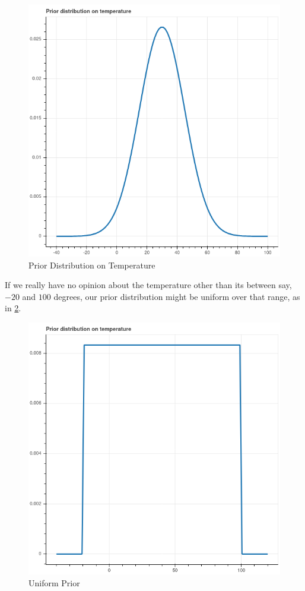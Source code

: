 \documentclass[
]{article}
\begin{document}
\begin{figure}
\hypertarget{fig:tempprior}{%
\centering
\includegraphics{../img/prior.png}
\caption{Prior Distribution on Temperature}\label{fig:tempprior}
}
\end{figure}

If we really have no opinion about the temperature other than its
between say, \(-20\) and \(100\) degrees, our prior distribution might
be uniform over that range, as in \cref{fig:uniformprior}.

\begin{figure}
\hypertarget{fig:uniformprior}{%
\centering
\includegraphics{../img/uniform.png}
\caption{Uniform Prior}\label{fig:uniformprior}
}
\end{figure}
\end{document}
